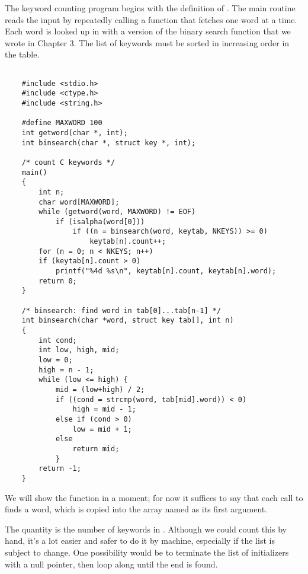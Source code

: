 The keyword counting program begins with the definition of .
The main routine reads the input by repeatedly calling a function  that fetches one word at a time.
Each word is looked up in  with a version of the binary search function that we wrote in Chapter 3.
The list of keywords must be sorted in increasing order in the table.

\begin{lstlisting}

	#include <stdio.h>
	#include <ctype.h>
	#include <string.h>

	#define MAXWORD 100
	int getword(char *, int);
	int binsearch(char *, struct key *, int);

	/* count C keywords */
	main()
	{
		int n;
		char word[MAXWORD];
		while (getword(word, MAXWORD) != EOF)
			if (isalpha(word[0]))
				if ((n = binsearch(word, keytab, NKEYS)) >= 0)
					keytab[n].count++;
		for (n = 0; n < NKEYS; n++)
		if (keytab[n].count > 0)
			printf("%4d %s\n", keytab[n].count, keytab[n].word);
		return 0;
	}

	/* binsearch: find word in tab[0]...tab[n-1] */
	int binsearch(char *word, struct key tab[], int n)
	{
		int cond;
		int low, high, mid;
		low = 0;
		high = n - 1;
		while (low <= high) {
			mid = (low+high) / 2;
			if ((cond = strcmp(word, tab[mid].word)) < 0)
				high = mid - 1;
			else if (cond > 0)
				low = mid + 1;
			else
				return mid;
			}
		return -1;
	}
\end{lstlisting}
We will show the function  in a moment; for now it suffices to say that each call to  finds a word, which is copied into the array named as its first argument.

The quantity  is the number of keywords in .
Although we could count this by hand, it's a lot easier and safer to do it by machine, especially if the list is subject to change.
One possibility would be to terminate the list of initializers with a null pointer, then loop along  until the end is found.


